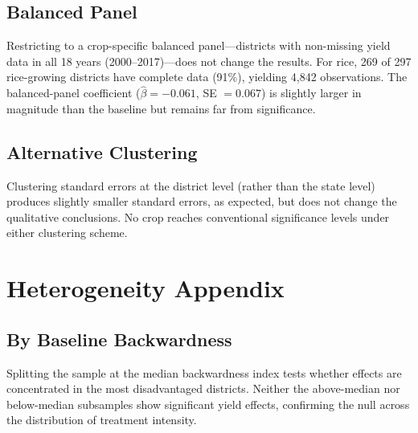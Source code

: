 \documentclass[12pt]{article}
\begin{document}
\subsection{Balanced Panel}

Restricting to a crop-specific balanced panel---districts with non-missing yield data in all 18 years (2000--2017)---does not change the results. For rice, 269 of 297 rice-growing districts have complete data (91\%), yielding 4,842 observations. The balanced-panel coefficient ($\hat\beta = -0.061$, SE $= 0.067$) is slightly larger in magnitude than the baseline but remains far from significance.

\subsection{Alternative Clustering}

Clustering standard errors at the district level (rather than the state level) produces slightly smaller standard errors, as expected, but does not change the qualitative conclusions. No crop reaches conventional significance levels under either clustering scheme.

\section{Heterogeneity Appendix}

\subsection{By Baseline Backwardness}

Splitting the sample at the median backwardness index tests whether effects are concentrated in the most disadvantaged districts. Neither the above-median nor below-median subsamples show significant yield effects, confirming the null across the distribution of treatment intensity.
\end{document}
